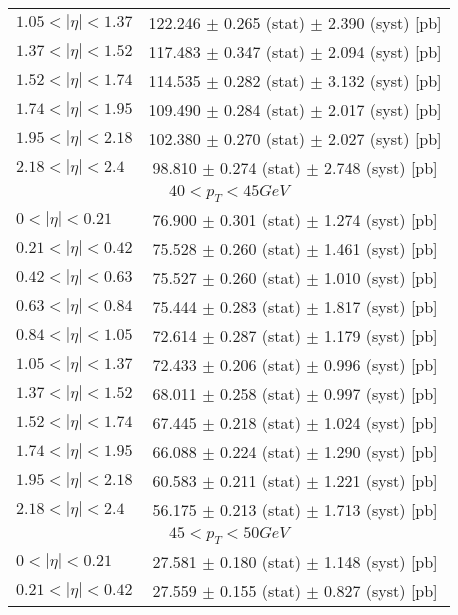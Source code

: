 \begin{tabular}{lc}
$1.05 < |\eta| <1.37$          & 122.246 $\pm$ 0.265 (stat) $\pm$ 2.390 (syst) [pb]  \\
$1.37 < |\eta| <1.52$          & 117.483 $\pm$ 0.347 (stat) $\pm$ 2.094 (syst) [pb]  \\
$1.52 < |\eta| <1.74$          & 114.535 $\pm$ 0.282 (stat) $\pm$ 3.132 (syst) [pb]  \\
$1.74 < |\eta| <1.95$          & 109.490 $\pm$ 0.284 (stat) $\pm$ 2.017 (syst) [pb]  \\
$1.95 < |\eta| <2.18$          & 102.380 $\pm$ 0.270 (stat) $\pm$ 2.027 (syst) [pb]  \\
$2.18 < |\eta| <2.4$           & 98.810 $\pm$ 0.274 (stat) $\pm$ 2.748 (syst) [pb]  \\
\hline
\multicolumn{2}{c}{$40 < p_{T} < 45 GeV$} \\
\hline
$0 < |\eta| <0.21$             & 76.900 $\pm$ 0.301 (stat) $\pm$ 1.274 (syst) [pb]  \\
$0.21 < |\eta| <0.42$          & 75.528 $\pm$ 0.260 (stat) $\pm$ 1.461 (syst) [pb]  \\
$0.42 < |\eta| <0.63$          & 75.527 $\pm$ 0.260 (stat) $\pm$ 1.010 (syst) [pb]  \\
$0.63 < |\eta| <0.84$          & 75.444 $\pm$ 0.283 (stat) $\pm$ 1.817 (syst) [pb]  \\
$0.84 < |\eta| <1.05$          & 72.614 $\pm$ 0.287 (stat) $\pm$ 1.179 (syst) [pb]  \\
$1.05 < |\eta| <1.37$          & 72.433 $\pm$ 0.206 (stat) $\pm$ 0.996 (syst) [pb]  \\
$1.37 < |\eta| <1.52$          & 68.011 $\pm$ 0.258 (stat) $\pm$ 0.997 (syst) [pb]  \\
$1.52 < |\eta| <1.74$          & 67.445 $\pm$ 0.218 (stat) $\pm$ 1.024 (syst) [pb]  \\
$1.74 < |\eta| <1.95$          & 66.088 $\pm$ 0.224 (stat) $\pm$ 1.290 (syst) [pb]  \\
$1.95 < |\eta| <2.18$          & 60.583 $\pm$ 0.211 (stat) $\pm$ 1.221 (syst) [pb]  \\
$2.18 < |\eta| <2.4$           & 56.175 $\pm$ 0.213 (stat) $\pm$ 1.713 (syst) [pb]  \\
\hline
\multicolumn{2}{c}{$45 < p_{T} < 50 GeV$} \\
\hline
$0 < |\eta| <0.21$             & 27.581 $\pm$ 0.180 (stat) $\pm$ 1.148 (syst) [pb]  \\
$0.21 < |\eta| <0.42$          & 27.559 $\pm$ 0.155 (stat) $\pm$ 0.827 (syst) [pb]  \\

\end{tabular}
